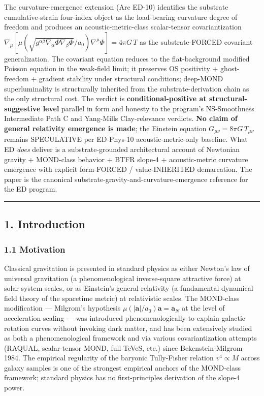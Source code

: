 \documentclass[
  11pt,a4paper]{article}
\begin{document}
The curvature-emergence extension (Arc ED-10) identifies the substrate
cumulative-strain four-index object as the load-bearing curvature degree
of freedom and produces an acoustic-metric-class scalar-tensor
covariantization
\(\nabla_\mu[\mu(\sqrt{g^{\alpha\beta}\nabla_\alpha\Phi\nabla_\beta\Phi}/a_0)\nabla^\mu\Phi] = 4\pi G\,T\)
as the substrate-FORCED covariant generalization. The covariant equation
reduces to the flat-background modified Poisson equation in the
weak-field limit; it preserves OS positivity + ghost-freedom + gradient
stability under structural conditions; deep-MOND superluminality is
structurally inherited from the substrate-derivation chain as the only
structural cost. The verdict is \textbf{conditional-positive at
structural-suggestive level} parallel in form and honesty to the
program's NS-Smoothness Intermediate Path C and Yang-Mills
Clay-relevance verdicts. \textbf{No claim of general relativity
emergence is made}; the Einstein equation
\(G_{\mu\nu} = 8\pi G\,T_{\mu\nu}\) remains SPECULATIVE per ED-Phys-10
acoustic-metric-only baseline. What ED \emph{does} deliver is a
substrate-grounded architectural account of Newtonian gravity +
MOND-class behavior + BTFR slope-4 + acoustic-metric curvature emergence
with explicit form-FORCED / value-INHERITED demarcation. The paper is
the canonical substrate-gravity-and-curvature-emergence reference for
the ED program.

\begin{center}\rule{0.5\linewidth}{0.5pt}\end{center}

\subsection{1. Introduction}\label{introduction}

\subsubsection{1.1 Motivation}\label{motivation}

Classical gravitation is presented in standard physics as either
Newton's law of universal gravitation (a phenomenological inverse-square
attractive force) at solar-system scales, or as Einstein's general
relativity (a fundamental dynamical field theory of the spacetime
metric) at relativistic scales. The MOND-class modification ---
Milgrom's hypothesis \(\mu(|\mathbf{a}|/a_0)\mathbf{a} = \mathbf{a}_N\)
at the level of acceleration scaling --- was introduced
phenomenologically to explain galactic rotation curves without invoking
dark matter, and has been extensively studied as both a phenomenological
framework and via various covariantization attempts (RAQUAL,
scalar-tensor MOND, full TeVeS, etc.) since Bekenstein-Milgrom 1984. The
empirical regularity of the baryonic Tully-Fisher relation
\(v^4 \propto M\) across galaxy samples is one of the strongest
empirical anchors of the MOND-class framework; standard physics has no
first-principles derivation of the slope-4 power.
\end{document}
